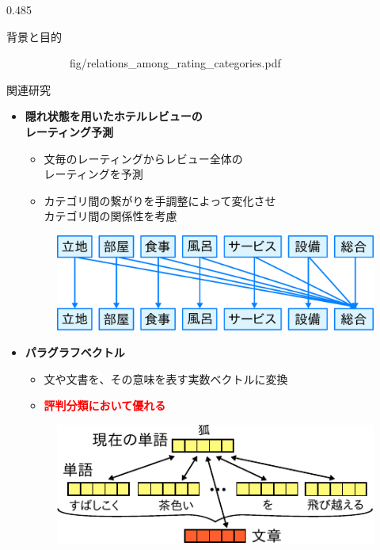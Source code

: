 \documentclass[unicode,10pt]{beamer}
\newcommand{\columnsize}{0.485\textwidth}
\newcommand{\itemtitle}[1]{\textbf{#1}\\}
\newcommand{\fire}[1]{\textcolor{red}{\textbf{#1}}}
\begin{document}
\begin{frame}
\begin{columns}[onlytextwidth,t]
\begin{column}{\columnsize}
\begin{block}{背景と目的}
\begin{figure}
\begin{subfigure}[t]{0.4\linewidth}
                        {fig/relations_among_rating_categories.pdf}
      \end{subfigure}
      \hspace*{\fill} %
    \end{figure}
  \end{block}

  \begin{block}{関連研究}
    \begin{itemize}
      \item \itemtitle{隠れ状態を用いたホテルレビューの\\
                       レーティング予測\cite{fujitani15}}
        \begin{itemize}
          \item 文毎のレーティングからレビュー全体の \\
                レーティングを予測
          \item カテゴリ間の繋がりを手調整によって変化させ \\
                カテゴリ間の関係性を考慮
        \end{itemize}
        \begin{figure}
          \includegraphics[width=0.7\linewidth]
              {fig/fujitani_miml_relations_among_rating_categories.pdf}
        \end{figure}
      \item \itemtitle{パラグラフベクトル\cite{quoc14}}
        \begin{itemize}
          \item 文や文書を、その意味を表す実数ベクトルに変換
          \item \fire{評判分類において優れる}
        \end{itemize}
        \begin{figure}
          \includegraphics{fig/paragraph_vector.pdf}

\end{figure}
\end{itemize}
\end{block}
\end{column}
\end{columns}
\end{frame}
\end{document}
